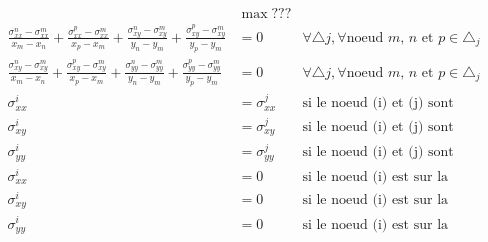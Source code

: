 \begin{align}
& \max ??? \\
\frac{\sigma_{xx}^n - \sigma_{xx}^m}{x_m - x_n}  + \frac{\sigma_{xx}^p - \sigma_{xx}^m}{x_p - x_m} + \frac{\sigma_{xy}^n - \sigma_{xy}^m}{y_n - y_m} + \frac{\sigma_{xy}^p - \sigma_{xy}^m}{y_p - y_m} &= 0  & \forall \triangle j, \forall \text{noeud $m$, $n$ et $p$} \in \triangle_j \\
\frac{\sigma_{xy}^n - \sigma_{xy}^m}{x_m - x_n}  + \frac{\sigma_{xy}^p - \sigma_{xy}^m}{x_p - x_m} + \frac{\sigma_{yy}^n - \sigma_{yy}^m}{y_n - y_m} + \frac{\sigma_{yy}^p - \sigma_{yy}^m}{y_p - y_m} &= 0  & \forall \triangle j, \forall \text{noeud $m$, $n$ et $p$} \in \triangle_j \\
\sigma_{xx}^i &= \sigma_{xx}^j & \text{si le noeud (i) et (j) sont confondus}\\
\sigma_{xy}^i &= \sigma_{xy}^j & \text{si le noeud (i) et (j) sont confondus}\\
\sigma_{yy}^i &= \sigma_{yy}^j & \text{si le noeud (i) et (j) sont confondus}\\
\sigma_{xx}^i &= 0 & \text{si le noeud (i) est sur la frontière} \\
\sigma_{xy}^i &= 0 & \text{si le noeud (i) est sur la frontière}\\
\sigma_{yy}^i &= 0 & \text{si le noeud (i) est sur la frontière}
\end{align}



